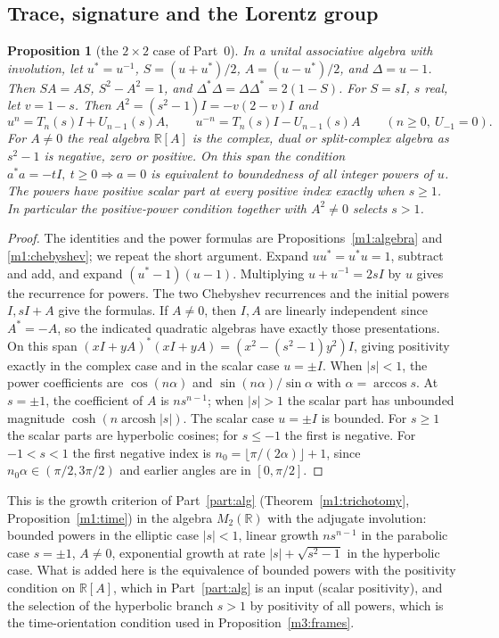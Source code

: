 \documentclass[11pt,reqno]{amsart}
\newtheorem{proposition}[theorem]{Proposition}
\theoremstyle{definition}
\theoremstyle{remark}
\numberwithin{equation}{section}
\newcommand{\R}{\mathbb{R}}
\begin{document}
\subsection{Trace, signature and the Lorentz group}

\begin{proposition}[the $2\times2$ case of Part~0]\label{m3:trichotomy}
In a unital associative algebra with involution, let \(u^*=u^{-1}\),
\(S=(u+u^*)/2\), \(A=(u-u^*)/2\), and \(\Delta=u-1\).
Then \(SA=AS\), \(S^2-A^2=1\), and
\(\Delta^*\Delta=\Delta\Delta^*=2(1-S)\).
For \(S=sI\), \(s\) real, let \(v=1-s\). Then
\(A^2=(s^2-1)I=-v(2-v)I\) and
\[
 u^n=T_n(s)I+U_{n-1}(s)A,\qquad
 u^{-n}=T_n(s)I-U_{n-1}(s)A\qquad(n\ge0,\ U_{-1}=0).
\]
For \(A\ne0\) the real algebra \(\R[A]\) is the complex, dual or
split-complex algebra as \(s^2-1\) is negative, zero or positive.
On this span the condition \(a^*a=-tI,\ t\ge0\Rightarrow a=0\) is
equivalent to boundedness of all integer powers of \(u\).
The powers have positive scalar part at every positive index exactly
when \(s\ge1\). In particular the positive-power condition together
with \(A^2\ne0\) selects \(s>1\).
\end{proposition}
\begin{proof}
The identities and the power formulas are Propositions~\ref{m1:algebra} and \ref{m1:chebyshev}; we repeat the short argument.
Expand \(uu^*=u^*u=1\), subtract and add, and expand
\((u^*-1)(u-1)\). Multiplying \(u+u^{-1}=2sI\) by \(u\) gives the
recurrence for powers. The two Chebyshev recurrences and the initial
powers \(I,sI+A\) give the formulas. If \(A\ne0\), then \(I,A\) are
linearly independent since \(A^*=-A\), so the indicated quadratic
algebras have exactly those presentations. On this span
\((xI+yA)^*(xI+yA)=(x^2-(s^2-1)y^2)I\), giving positivity exactly
in the complex case and in the scalar case \(u=\pm I\).
When \(|s|<1\), the power coefficients are
\(\cos(n\alpha)\) and \(\sin(n\alpha)/\sin\alpha\) with
\(\alpha=\arccos s\). At \(s=\pm1\), the coefficient of \(A\) is
\(ns^{n-1}\); when \(|s|>1\) the scalar part has unbounded magnitude
\(\cosh(n\operatorname{arcosh}|s|)\). The scalar case \(u=\pm I\)
is bounded. For \(s\ge1\) the scalar parts are hyperbolic cosines;
for \(s\le-1\) the first is negative. For \(-1<s<1\) the first
negative index is \(n_0=\lfloor\pi/(2\alpha)\rfloor+1\),
since \(n_0\alpha\in(\pi/2,3\pi/2)\) and earlier angles are
in \([0,\pi/2]\).
\end{proof}

\noindent This is the growth criterion of Part~\ref{part:alg} (Theorem~\ref{m1:trichotomy}, Proposition~\ref{m1:time}) in the
algebra $M_2(\R)$ with the adjugate involution: bounded powers in the elliptic case $|s|<1$, linear growth $ns^{n-1}$ in the parabolic
case $s=\pm1$, $A\ne0$, exponential growth at rate $|s|+\sqrt{s^2-1}$ in the hyperbolic case.  What is added here is the equivalence of
bounded powers with the positivity condition on $\R[A]$, which in Part~\ref{part:alg} is an input (scalar positivity), and the
selection of the hyperbolic branch $s>1$ by positivity of all powers, which is the time-orientation condition used in
Proposition~\ref{m3:frames}.
\end{document}
